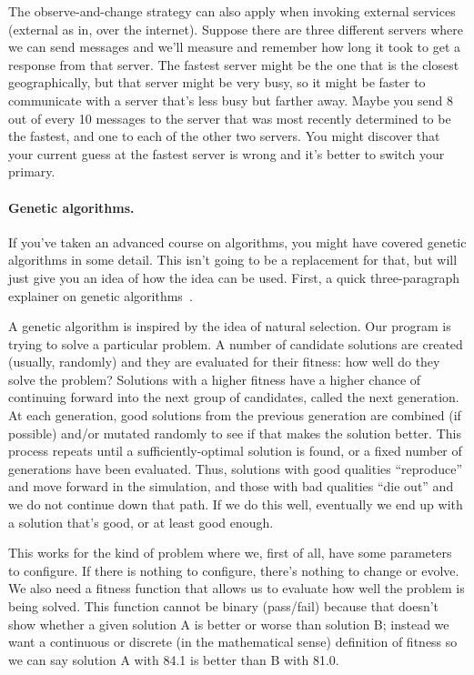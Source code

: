 \documentclass[a4paper]{report}
\begin{document}
The observe-and-change strategy can also apply when invoking external services (external as in, over the internet). Suppose there are three different servers where we can send messages and we'll measure and remember how long it took to get a response from that server. The fastest server might be the one that is the closest geographically, but that server might be very busy, so it might be faster to communicate with a server that's less busy but farther away. Maybe you send 8 out of every 10 messages to the server that was most recently determined to be the fastest, and one to each of the other two servers. You might discover that your current guess at the fastest server is wrong and it's better to switch your primary.


\paragraph{Genetic algorithms.}
If you've taken an advanced course on algorithms, you might have covered genetic algorithms in some detail. This isn't going to be a replacement for that, but will just give you an idea of how the idea can be used. First, a quick three-paragraph explainer on genetic algorithms~\cite{genetic}.

A genetic algorithm is inspired by the idea of natural selection. Our program is trying to solve a particular problem. A number of candidate solutions are created (usually, randomly) and they are evaluated for their fitness: how well do they solve the problem? Solutions with a higher fitness have a higher chance of continuing forward into the next group of candidates, called the next generation. At each generation, good solutions from the previous generation are combined (if possible) and/or mutated randomly to see if that makes the solution better. This process repeats until a sufficiently-optimal solution is found, or a fixed number of generations have been evaluated. Thus, solutions with good qualities ``reproduce'' and move forward in the simulation, and those with bad qualities ``die out'' and we do not continue down that path. If we do this well, eventually we end up with a solution that's good, or at least good enough.

This works for the kind of problem where we, first of all, have some parameters to configure. If there is nothing to configure, there's nothing to change or evolve. We also need a fitness function that allows us to evaluate how well the problem is being solved. This function cannot be binary (pass/fail) because that doesn't show whether a given solution A is better or worse than solution B; instead we want a continuous or discrete (in the mathematical sense) definition of fitness so we can say solution A with 84.1 is better than B with 81.0.
\end{document}
